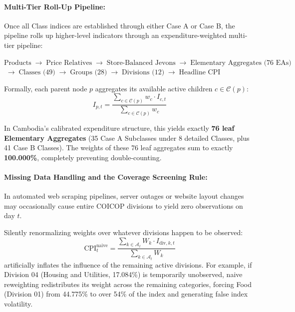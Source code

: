 \paragraph{Multi-Tier Roll-Up Pipeline:}
Once all Class indices are established through either Case A or Case B, the pipeline rolls up higher-level indicators through an expenditure-weighted multi-tier pipeline:
\begin{center}
$\text{Products} \;\longrightarrow\; \text{Price Relatives} \;\longrightarrow\; \text{Store-Balanced Jevons} \;\longrightarrow\; \text{Elementary Aggregates (76 EAs)}$ \\
$\;\longrightarrow\; \text{Classes (49)} \;\longrightarrow\; \text{Groups (28)} \;\longrightarrow\; \text{Divisions (12)} \;\longrightarrow\; \text{Headline CPI}$
\end{center}
Formally, each parent node $p$ aggregates its available active children $c \in \mathcal{C}(p)$:
\begin{equation}
    I_{p, t} = \frac{\sum_{c \in \mathcal{C}(p)} w_c \cdot I_{c, t}}{\sum_{c \in \mathcal{C}(p)} w_c}
\end{equation}

\hs In Cambodia's calibrated expenditure structure, this yields exactly \textbf{76 leaf Elementary Aggregates} (35 Case A Subclasses under 8 detailed Classes, plus 41 Case B Classes). The weights of these 76 leaf aggregates sum to exactly \textbf{100.000\%}, completely preventing double-counting.

\paragraph{Missing Data Handling and the Coverage Screening Rule:}
In automated web scraping pipelines, server outages or website layout changes may occasionally cause entire COICOP divisions to yield zero observations on day $t$.

Silently renormalizing weights over whatever divisions happen to be observed:
\begin{equation}
    \text{CPI}_t^{\text{naive}} = \frac{\sum_{k \in \mathcal{A}_t} W_k \cdot I_{\text{div}, k, t}}{\sum_{k \in \mathcal{A}_t} W_k}
\end{equation}
artificially inflates the influence of the remaining active divisions. For example, if Division 04 (Housing and Utilities, 17.084\%) is temporarily unobserved, naive reweighting redistributes its weight across the remaining categories, forcing Food (Division 01) from 44.775\% to over 54\% of the index and generating false index volatility.

